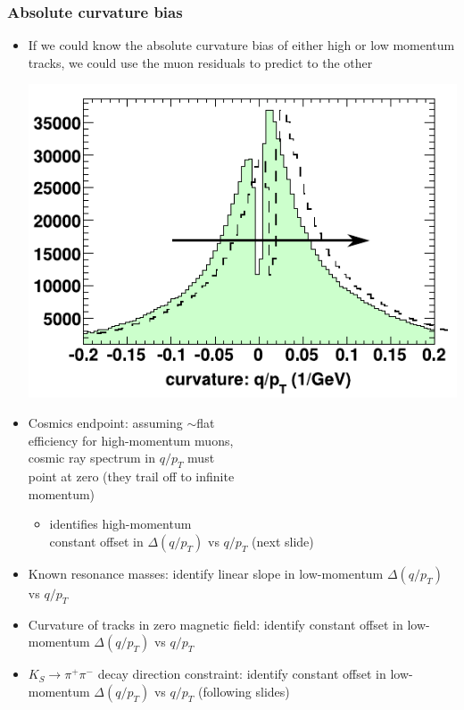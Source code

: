 \documentclass[compress]{beamer}
\begin{document}
\begin{frame}
\frametitle{Absolute curvature bias}
\begin{itemize}
\item If we could know the absolute curvature bias of either high or
  low momentum tracks, we could use the muon residuals to predict
  to the other

\hfill \includegraphics[width=0.4\linewidth]{biases.pdf}

\vspace{-3 cm}
\item Cosmics endpoint: assuming $\sim$flat \\ efficiency for
  high-momentum muons, \\ cosmic ray spectrum in $q/p_T$ must \\ point at
  zero (they trail off to infinite \\ momentum)
\begin{itemize}
\item identifies high-momentum \\ constant offset in $\Delta(q/p_T)$ vs $q/p_T$ (next slide)
\end{itemize}

\item Known resonance masses: identify linear slope in low-momentum $\Delta(q/p_T)$ vs $q/p_T$

\item Curvature of tracks in zero magnetic field: identify constant offset in low-momentum $\Delta(q/p_T)$ vs $q/p_T$

\item $K_S \to \pi^+\pi^-$ decay direction constraint: identify constant offset in low-momentum $\Delta(q/p_T)$ vs $q/p_T$ (following slides)
\end{itemize}
\end{frame}
\end{document}
